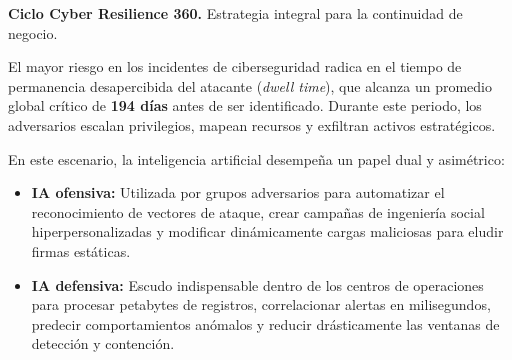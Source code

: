 \begin{center}

{\small\textbf{Ciclo Cyber Resilience 360.} Estrategia integral para la continuidad de negocio.\par}
\end{center}

El mayor riesgo en los incidentes de ciberseguridad radica en el tiempo de permanencia desapercibida del atacante (\textit{dwell time}), que alcanza un promedio global crítico de \textbf{194 días} antes de ser identificado. Durante este periodo, los adversarios escalan privilegios, mapean recursos y exfiltran activos estratégicos.

En este escenario, la inteligencia artificial desempeña un papel dual y asimétrico:
\begin{itemize}
  \item \textbf{IA ofensiva:} Utilizada por grupos adversarios para automatizar el reconocimiento de vectores de ataque, crear campañas de ingeniería social hiperpersonalizadas y modificar dinámicamente cargas maliciosas para eludir firmas estáticas.
  \item \textbf{IA defensiva:} Escudo indispensable dentro de los centros de operaciones para procesar petabytes de registros, correlacionar alertas en milisegundos, predecir comportamientos anómalos y reducir drásticamente las ventanas de detección y contención.
\end{itemize}

